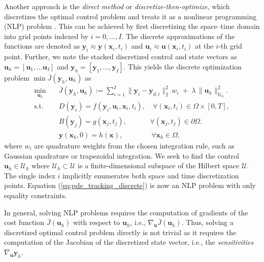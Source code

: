 \documentclass[final,1p,times]{elsarticle}
\theoremstyle{plain} %
\theoremstyle{definition} %
\theoremstyle{remark} %
\begin{document}
Another approach is the \textit{direct method} or \textit {discretize-then-optimize}, which discretizes the optimal control problem and treats it as a nonlinear programming (NLP) problem \cite{Hinze2009OptimizationPDEConstraints}. This can be achieved by first discretizing the space–time domain into grid points indexed by $i=0,\dots, I$. The discrete approximations of the functions are denoted as $\mathbf{y}_i \approx \mathbf{y}(\mathbf{x}_i,t_i)$ and $\mathbf{u}_i \approx \mathbf{u}(\mathbf{x}_i,t_i)$ at the $i$-th grid point. Further, we note the stacked discretized control and state vectors as $\mathbf{u}_h=[\mathbf{u}_1,\dots \mathbf{u}_I]$ and $\mathbf{y}_h=[\mathbf{y}_1,\dots,\mathbf{y}_I]$. This yields the discrete optimization problem $\min \bar{J}(\mathbf{y}_h,\mathbf{u}_h)$ as
%
\begin{equation}\label{eq:pde_tracking_discrete}
\begin{aligned}
\min_{\mathbf{u}_h}\quad 
& \bar{J}(\mathbf{y}_h,\mathbf{u}_h)
:= \sum_{i=1}^{I}\|\mathbf{y}_i-\mathbf{y}_{d,i}\|_2^2\,w_i
\;+\; \lambda\,\|\mathbf{u}_h\|_{\mathcal{U}_h}^2 .\\
\text{s.t.}\quad 
& D(\mathbf{y}_i) = f(\mathbf{y}_i,\mathbf{u}_i,\mathbf{x}_i,t_i), \quad \forall(\mathbf{x}_i,t_i)\in \Omega\times[0,T],\\
& B(\mathbf{y}_j) = g(\mathbf{x}_j,t_j), \; \quad \qquad  \forall(\mathbf{x}_j,t_j)\in \partial\Omega.\\
&\mathbf{y}(\mathbf{x}_k,0)=h(\mathbf{x}), \qquad \qquad \forall \mathbf{x}_k\in \Omega,
\end{aligned}
\end{equation}
where $w_i$ are quadrature weights from the chosen integration rule, such as Gaussian quadrature or trapezoidal integration. We seek to find the control $\mathbf{u}_h\in\mathcal{U}_h$ where $\mathcal{U}_h\subset\mathcal{U}$ is a finite-dimensional subspace of the Hilbert space $\mathcal{U}$. The single index $i$ implicitly enumerates both space and time discretization points. Equation (\ref{eq:pde_tracking_discrete}) is now an NLP problem with only equality constraints. 

In general, solving NLP problems requires the computation of gradients of the cost function $\bar{J}(\mathbf{u}_h)$ with respect to $\mathbf{u}_h$, i.e., $\nabla_\mathbf{u}\bar{J}(\mathbf{u}_h)$. Thus, solving a discretized optimal control problem directly is not trivial as it requires the computation of the Jacobian of the discretized state vector, i.e., the \textit{sensitivities} $\nabla_\mathbf{u}\mathbf{y}_h$. 
\end{document}

